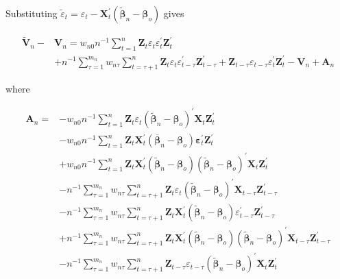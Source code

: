 \documentclass[10pt]{article}
\begin{document}
Substituting $\tilde{\varepsilon}_{t}=\varepsilon_{t}-\mathbf{X}_{t}^{\prime}\left(\tilde{\boldsymbol{\beta}}_{n}-\boldsymbol{\beta}_{o}\right)$ gives

$$
\begin{aligned}
\tilde{\mathbf{V}}_{n}- & \mathbf{V}_{n}=w_{n 0} n^{-1} \sum_{t=1}^{n} \mathbf{Z}_{t} \varepsilon_{t} \varepsilon_{t}^{\prime} \mathbf{Z}_{t}^{\prime} \\
& +n^{-1} \sum_{\tau=1}^{m_{n}} w_{n \tau} \sum_{t=\tau+1}^{n} \mathbf{Z}_{t} \varepsilon_{t} \varepsilon_{t-\tau}^{\prime} \mathbf{Z}_{t-\tau}^{\prime}+\mathbf{Z}_{t-\tau} \varepsilon_{t-\tau} \varepsilon_{t}^{\prime} \mathbf{Z}_{t}^{\prime}-\mathbf{V}_{n}+\mathbf{A}_{n}
\end{aligned}
$$

where

$$
\begin{aligned}
\mathbf{A}_{n}= & -w_{n 0} n^{-1} \sum_{t=1}^{n} \mathbf{Z}_{t} \varepsilon_{t}\left(\tilde{\boldsymbol{\beta}}_{n}-\boldsymbol{\beta}_{o}\right)^{\prime} \mathbf{X}_{t} \mathbf{Z}_{t}^{\prime} \\
& -w_{n 0} n^{-1} \sum_{t=1}^{n} \mathbf{Z}_{t} \mathbf{X}_{t}^{\prime}\left(\overline{\boldsymbol{\beta}}_{n}-\boldsymbol{\beta}_{o}\right) \boldsymbol{\varepsilon}_{t}^{\prime} \mathbf{Z}_{t}^{\prime} \\
& +w_{n 0} n^{-1} \sum_{t=1}^{n} \mathbf{Z}_{t} \mathbf{X}_{t}^{\prime}\left(\tilde{\boldsymbol{\beta}}_{n}-\boldsymbol{\beta}_{o}\right)\left(\tilde{\boldsymbol{\beta}}_{n}-\boldsymbol{\beta}_{o}\right)^{\prime} \mathbf{X}_{t} \mathbf{Z}_{t}^{\prime} \\
& -n^{-1} \sum_{\tau=1}^{m_{n}} w_{n \tau} \sum_{t=\tau+1}^{n} \mathbf{Z}_{t} \varepsilon_{t}\left(\tilde{\boldsymbol{\beta}}_{n}-\boldsymbol{\beta}_{o}\right)^{\prime} \mathbf{X}_{t-\tau} \mathbf{Z}_{t-\tau}^{\prime} \\
& -n^{-1} \sum_{\tau=1}^{m_{n}} w_{n \tau} \sum_{t=\tau+1}^{n} \mathbf{Z}_{t} \mathbf{X}_{t}^{\prime}\left(\tilde{\boldsymbol{\beta}}_{n}-\boldsymbol{\beta}_{o}\right) \varepsilon_{t-\tau}^{\prime} \mathbf{Z}_{t-\tau}^{\prime} \\
& +n^{-1} \sum_{\tau=1}^{m_{n}} w_{n \tau} \sum_{t=\tau+1}^{n} \mathbf{Z}_{t} \mathbf{X}_{t}^{\prime}\left(\tilde{\boldsymbol{\beta}}_{n}-\boldsymbol{\beta}_{o}\right)\left(\tilde{\boldsymbol{\beta}}_{n}-\boldsymbol{\beta}_{o}\right)^{\prime} \mathbf{X}_{t-\tau} \mathbf{Z}_{t-\tau}^{\prime} \\
& -n^{-1} \sum_{\tau=1}^{m_{n}} w_{n \tau} \sum_{t=\tau+1}^{n} \mathbf{Z}_{t-\tau} \varepsilon_{t-\tau}\left(\tilde{\boldsymbol{\beta}}_{n}-\boldsymbol{\beta}_{o}\right)^{\prime} \mathbf{X}_{t} \mathbf{Z}_{t}^{\prime} \\

\end{aligned}$$
\end{document}
